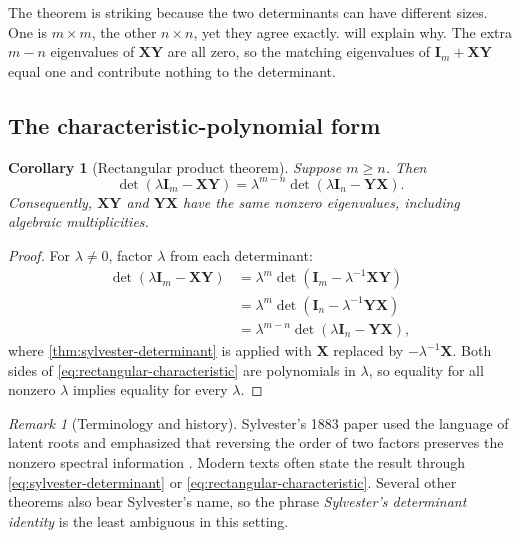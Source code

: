 \documentclass[11pt]{article}
\newcommand{\I}{\mathbf{I}}
\newcommand{\mat}[1]{\mathbf{#1}}
\newtheorem{corollary}[corollary]{Corollary}
\theoremstyle{definition}
\theoremstyle{remark}
\newtheorem{remark}[remark]{Remark}
\begin{document}
The theorem is striking because the two determinants can have different sizes. One is \(m\times m\), the other \(n\times n\), yet they agree exactly.  will explain why. The extra \(m-n\) eigenvalues of \(\mat{X}\mat{Y}\) are all zero, so the matching eigenvalues of \(\I_m+\mat{X}\mat{Y}\) equal one and contribute nothing to the determinant.

\subsection{The characteristic-polynomial form}

\begin{corollary}[Rectangular product theorem]
\label{cor:rectangular-characteristic}
Suppose \(m\geq n\). Then
\begin{equation}
  \det(\lambda\I_m-\mat{X}\mat{Y})
  =
  \lambda^{m-n}
  \det(\lambda\I_n-\mat{Y}\mat{X}).
  \label{eq:rectangular-characteristic}
\end{equation}
Consequently, \(\mat{X}\mat{Y}\) and \(\mat{Y}\mat{X}\) have the same nonzero eigenvalues, including algebraic multiplicities.
\end{corollary}

\begin{proof}
For \(\lambda\neq0\), factor \(\lambda\) from each determinant:
\begin{align*}
  \det(\lambda\I_m-\mat{X}\mat{Y})
  &=\lambda^m
    \det\!\left(\I_m-\lambda^{-1}\mat{X}\mat{Y}\right)\\
  &=\lambda^m
    \det\!\left(\I_n-\lambda^{-1}\mat{Y}\mat{X}\right)\\
  &=\lambda^{m-n}
    \det(\lambda\I_n-\mat{Y}\mat{X}),
\end{align*}
where \cref{thm:sylvester-determinant} is applied with
\(\mat{X}\) replaced by \(-\lambda^{-1}\mat{X}\). Both sides of
\cref{eq:rectangular-characteristic} are polynomials in \(\lambda\), so equality for all nonzero \(\lambda\) implies equality for every \(\lambda\).
\end{proof}

\begin{remark}[Terminology and history]
Sylvester's 1883 paper used the language of latent roots and emphasized that reversing the order of two factors preserves the nonzero spectral information \parencite{sylvester1883equation}. Modern texts often state the result through \cref{eq:sylvester-determinant} or \cref{eq:rectangular-characteristic}. Several other theorems also bear Sylvester's name, so the phrase \emph{Sylvester's determinant identity} is the least ambiguous in this setting.
\end{remark}
\end{document}
